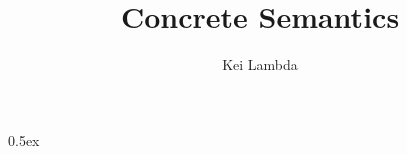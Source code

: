 \documentclass[11pt,a4paper]{article}
\begin{document}
\title{Concrete Semantics}
\author{Kei Lambda}
\maketitle

\tableofcontents

\parindent 0pt\parskip 0.5ex



%
%
\end{document}
